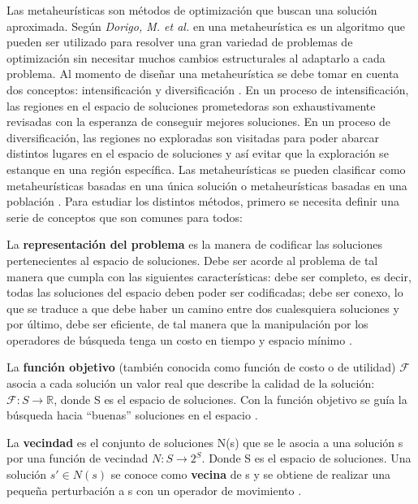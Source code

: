 Las metaheurísticas son métodos de optimización que buscan una solución aproximada. Según \emph{Dorigo, M. et al.} en \cite{Dorigo2017} una metaheurística es un algoritmo que pueden ser utilizado para resolver una gran variedad de problemas de optimización sin necesitar muchos cambios estructurales al adaptarlo a cada problema. Al momento de diseñar una metaheurística se debe tomar en cuenta dos conceptos: intensificación y diversificación \cite{talbi2009metaheuristics}. En un proceso de intensificación, las regiones en el espacio de soluciones prometedoras son exhaustivamente revisadas con la esperanza de conseguir mejores soluciones. En un proceso de diversificación, las regiones no exploradas son visitadas para poder abarcar distintos lugares en el espacio de soluciones y así evitar que la exploración se estanque en una región específica. Las metaheurísticas se pueden clasificar como metaheurísticas basadas en una única solución o metaheurísticas basadas en una población \cite{talbi2009metaheuristics}. Para estudiar los distintos métodos, primero se necesita definir una serie de conceptos que son comunes para todos:\\

\begin{definicion}
La \textbf{representación del problema} es la manera de codificar las soluciones pertenecientes al espacio de soluciones. Debe ser acorde al problema de tal manera que cumpla con las siguientes características: debe ser completo, es decir, todas las soluciones del espacio deben poder ser codificadas; debe ser conexo, lo que se traduce a que debe haber un camino entre dos cualesquiera soluciones y por último, debe ser eficiente, de tal manera que la manipulación por los operadores de búsqueda tenga un costo en tiempo y espacio mínimo \cite{talbi2009metaheuristics}.\\
\end{definicion}

\begin{definicion}
La \textbf{función objetivo} (también conocida como función de costo o de utilidad) $\mathcal{F}$ asocia a cada solución un valor real que describe la calidad de la solución: $\mathcal{F}: S \rightarrow \mathbb{R}$, donde S es el espacio de soluciones. Con la función objetivo se guía la búsqueda hacia ``buenas'' soluciones en el espacio \cite{talbi2009metaheuristics}.\\
\end{definicion}

\begin{definicion}
La \textbf{vecindad} es el conjunto de soluciones N(s) que se le asocia a una solución s por una función de vecindad $N:S \rightarrow 2^S$. Donde S es el espacio de soluciones. Una solución $s' \in N(s)$ se conoce como \textbf{vecina} de s y se obtiene de realizar una pequeña perturbación a s con un operador de movimiento \cite{talbi2009metaheuristics}.   
\end{definicion}

